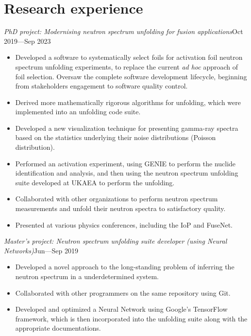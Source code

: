 \documentclass[a4paper, 12pt]{article}
\newcommand{\expentry}[3]{\emph{#1}\hfill{#2}---{#3}}
\begin{document}
\section{Research experience}
\expentry{PhD project: Modernising neutron spectrum unfolding for fusion applications}{Oct 2019}{Sep 2023}
    \begin{itemize}
    \setlength\itemsep{0em}
    \item Developed a software to systematically select foils for activation foil neutron spectrum unfolding experiments, to replace the current \textit{ad hoc} approach of foil selection. Oversaw the complete software development lifecycle, beginning from stakeholders engagement to software quality control.
    \item Derived more mathematically rigorous algorithms for unfolding, which were implemented into an unfolding code suite.
    \item Developed a new visualization technique for presenting gamma-ray spectra based on the statistics underlying their noise distributions (Poisson distribution).
    \item Performed an activation experiment, using GENIE to perform the nuclide identification and analysis, and then using the neutron spectrum unfolding suite developed at UKAEA  to perform the unfolding.
    \item Collaborated with other organizations to perform neutron spectrum measurements and unfold their neutron spectra to satisfactory quality.
    \item Presented at various physics conferences, including the IoP and FuseNet.
    \end{itemize}
\expentry{Master's project: Neutron spectrum unfolding suite developer (using Neural Networks)}{Jun}{Sep 2019}
    \begin{itemize}
    \setlength\itemsep{0em}
    \item Developed a novel approach to the long-standing problem of inferring the neutron spectrum in a underdetermined system.
    \item Collaborated with other programmers on the same repository using Git.
    \item Developed and optimized a Neural Network using Google's TensorFlow framework, which is then incorporated into the unfolding suite along with the appropriate documentations.
    \end{itemize}
\end{document}
